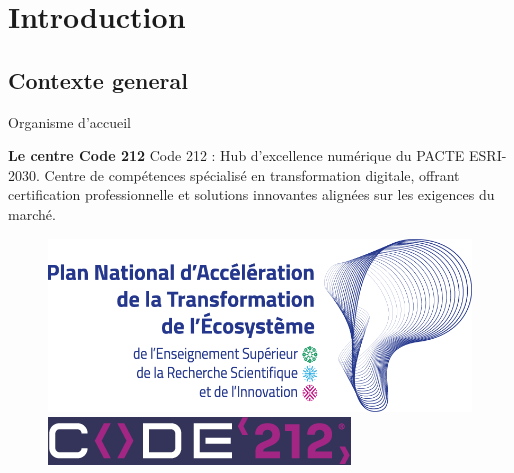 \section{Introduction}

\subsection{Contexte general}


\begin{frame}{Organisme d'accueil}

    \vspace{0.5cm} %
    \begin{block}{\centering \textbf{\Large Le centre Code 212}}
        \centering
        \vspace{0.2cm} %
        Code 212 : Hub d'excellence numérique du PACTE ESRI-2030. Centre de compétences spécialisé en transformation digitale, offrant certification professionnelle et solutions innovantes alignées sur les exigences du marché.
    \end{block}

    \begin{figure}[H]
        \centering
        \begin{minipage}[b]{0.45\linewidth}
            \centering
            \includegraphics[width=\linewidth]{assets/images/esri.png}
        \end{minipage}
        \begin{minipage}[b]{0.45\linewidth}
            \centering
            \includegraphics[width=\linewidth]{assets/images/code.png}
        \end{minipage}
    \end{figure}
\end{frame}



